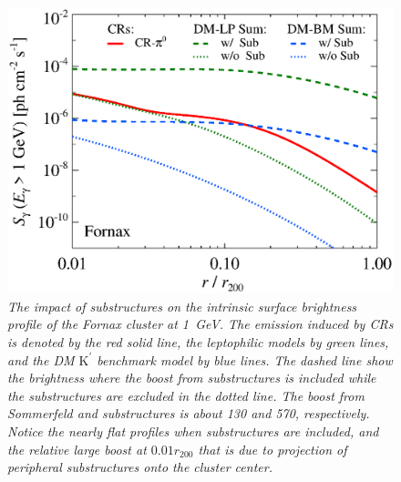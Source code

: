\documentclass[10pt,aps,pra,reprint,amsmath,amsfonts,amssymb,showpacs,nofootinbib,floatfix]{revtex4-1}
\newcommand{\rmn}{\mathrm}
\newcommand{\Kp}{\rmn{K}^\prime}
\newcommand{\rvir}{r_{200}}
\begin{document}
\begin{figure}%
 \includegraphics[width=0.99\columnwidth]{figures/SB.resolved.v11.1GeV.SF300.noSuB.vs.SubMass.elmu.eps}
 \caption{\it The impact of substructures on the intrinsic surface
   brightness profile of the Fornax cluster at 1~GeV. The emission
   induced by CRs is denoted by the red solid line, the leptophilic
   models by green lines, and the DM $\Kp$ benchmark model by blue
   lines. The dashed line show the brightness where the boost from
   substructures is included while the substructures are excluded in
   the dotted line. The boost from Sommerfeld and substructures is
   about 130 and 570, respectively. Notice the nearly flat profiles
   when substructures are included, and the relative large boost at
   $0.01\rvir$ that is due to projection of peripheral substructures
   onto the cluster center.}
 \label{fig:SB_sub}
\end{figure}
\end{document}
